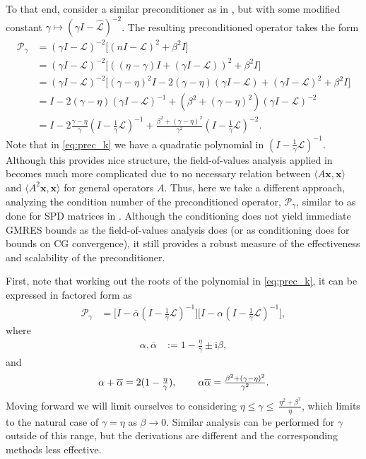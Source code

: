 \documentclass[review]{siamart}
\begin{document}
To that end, consider a similar preconditioner as in
, but with some modified constant $\gamma \mapsto
(\gamma I - \widehat{\mathcal{L}})^{-2}$. The resulting preconditioned
operator takes the form
%
\begin{align}\nonumber
\mathcal{P}_\gamma & = 
(\gamma I - \mathcal{L})^{-2}\Big[(nI - \mathcal{L})^2 + \beta^2 I\Big] \\ \nonumber
& = (\gamma I - \mathcal{L})^{-2}\Big[((\eta-\gamma)I + (\gamma I - \mathcal{L}))^2 + \beta^2 I\Big] \\
& = (\gamma I - \mathcal{L})^{-2}\Big[(\gamma-\eta)^2I - 2(\gamma-\eta)(\gamma I - \mathcal{L}) +
	(\gamma I - \mathcal{L})^2 + \beta^2 I\Big] \nonumber\\
& = I - 2(\gamma-\eta)(\gamma I - \mathcal{L})^{-1} + (\beta^2 + (\gamma-\eta)^2)(\gamma I - 
	\mathcal{L})^{-2} \nonumber\\
& = I - 2\frac{\gamma-\eta}{\gamma}\left(I - \tfrac{1}{\gamma}\mathcal{L}\right)^{-1} +
	\frac{\beta^2 + (\gamma-\eta)^2}{\gamma^2}
	\left(I - \tfrac{1}{\gamma}\mathcal{L}\right)^{-2}.\label{eq:prec_k}
\end{align}
%
Note that in \eqref{eq:prec_k} we have a quadratic polynomial in
$(I - \tfrac{1}{\gamma}\mathcal{L})^{-1}$. Although this provides
nice structure, the field-of-values analysis applied in 
becomes much more complicated due to no necessary relation between
$\langle A\mathbf{x},\mathbf{x}\rangle$ and 
$\langle A^2\mathbf{x},\mathbf{x}\rangle$ for general operators $A$. Thus, here
we take a different approach, analyzing the condition number of the preconditioned
operator, $\mathcal{P}_\gamma$, similar to as done for SPD matrices in \cite{exh}.
Although the conditioning does not yield immediate GMRES bounds as the field-of-values
analysis does (or as conditioning does for bounds on CG convergence), it still
provides a robust measure of the effectiveness and scalability of the 
preconditioner.

First, note that working out the roots of the polynomial in \eqref{eq:prec_k},
it can be expressed in factored form as
%
\begin{align*}
\mathcal{P}_\gamma
	& = \Big[I - \overline{\alpha}\left(I - \tfrac{1}{\gamma}\mathcal{L}\right)^{-1}\Big]
	\Big[I - \alpha\left(I - \tfrac{1}{\gamma}\mathcal{L}\right)^{-1}\Big],
\end{align*}
%
where
%
\begin{align}\label{eq:alpha}
\alpha, \overline{\alpha} & := 1 - \frac{\eta}{\gamma} \pm \mathrm{i}\beta,
\end{align}
%
and
%
\begin{align}\label{eq:alphs_eq}
\alpha + \overline{\alpha} = 2(1 - \tfrac{\eta}{\gamma}), \hspace{5ex}
\alpha\overline{\alpha} = \tfrac{\beta^2 + (\gamma-\eta)^2}{\gamma^2}.
\end{align}
%
Moving forward we will limit ourselves to considering $\eta \leq \gamma \leq \
\tfrac{\eta^2+\beta^2}{\eta}$, which limits to the natural case of $\gamma = \eta$
as $\beta \to 0$. Similar analysis can be performed for $\gamma$ outside of
this range, but the derivations are different and the corresponding methods
less effective.
\end{document}
